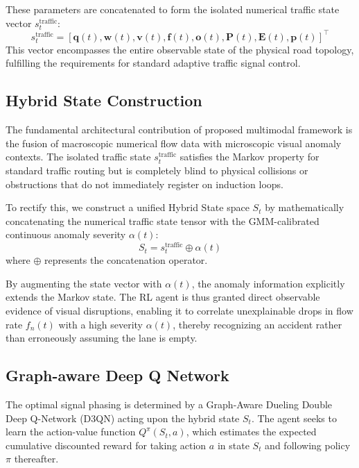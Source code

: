 \documentclass[conference]{IEEEtran}
\begin{document}
These parameters are concatenated to form the isolated numerical traffic state vector $s_t^{\text{traffic}}$:
\begin{equation}
s_t^{\text{traffic}} = \left[ \mathbf{q}(t), \mathbf{w}(t), \mathbf{v}(t), \mathbf{f}(t), \mathbf{o}(t), \mathbf{P}(t), \mathbf{E}(t), \mathbf{p}(t) \right]^\top
\label{eq:traffic_state}
\end{equation}
This vector encompasses the entire observable state of the physical road topology, fulfilling the requirements for standard adaptive traffic signal control.

\subsection{Hybrid State Construction}
\label{subsec:hybrid_state}

The fundamental architectural contribution of proposed multimodal framework is the fusion of macroscopic numerical flow data with microscopic visual anomaly contexts. The isolated traffic state $s_t^{\text{traffic}}$ satisfies the Markov property for standard traffic routing but is completely blind to physical collisions or obstructions that do not immediately register on induction loops.

To rectify this, we construct a unified Hybrid State space $S_t$ by mathematically concatenating the numerical traffic state tensor with the GMM-calibrated continuous anomaly severity $\alpha(t)$:
\begin{equation}
S_t = s_t^{\text{traffic}} \oplus \alpha(t)
\label{eq:hybrid_state}
\end{equation}
where $\oplus$ represents the concatenation operator. 

By augmenting the state vector with $\alpha(t)$, the anomaly information explicitly extends the Markov state. The RL agent is thus granted direct observable evidence of visual disruptions, enabling it to correlate unexplainable drops in flow rate $f_n(t)$ with a high severity $\alpha(t)$, thereby recognizing an accident rather than erroneously assuming the lane is empty.

\subsection{Graph-aware Deep Q Network}
\label{subsec:graph_dqn}

The optimal signal phasing is determined by a Graph-Aware Dueling Double Deep Q-Network (D3QN) acting upon the hybrid state $S_t$. The agent seeks to learn the action-value function $Q^\pi(S_t, a)$, which estimates the expected cumulative discounted reward for taking action $a$ in state $S_t$ and following policy $\pi$ thereafter.
\end{document}
